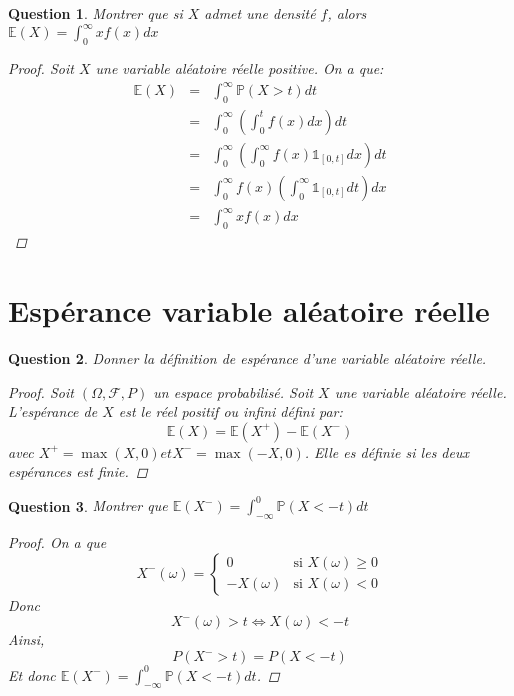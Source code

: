 \documentclass{article}
\theoremstyle{plain}
\newtheorem{question}{Question}
\theoremstyle{definition}
\begin{document}
\begin{question}
	Montrer que si $X$ admet une densité $f$, alors $\mathbb{E} (X) = \int_0^{\infty} x f(x) dx$
	\begin{proof}
		Soit $X$ une variable aléatoire réelle positive. On a que:
		\begin{eqnarray*}
			\mathbb{E} (X) &=& \int_0^{\infty} \mathbb{P} (X > t) dt \\
			&=& \int_0^{\infty} \left( \int_0^{t} f(x) dx \right) dt \\
			&=& \int_0^{\infty} \left( \int_0^{\infty} f(x) \mathds{1}_{[0, t]} dx \right) dt \\
			&=& \int_0^{\infty} f(x) \left( \int_0^{\infty} \mathds{1}_{[0, t]} dt \right) dx \\
			&=& \int_0^{\infty} x f(x) dx
		\end{eqnarray*}
	\end{proof}

\end{question}

\section{Espérance variable aléatoire réelle}

\begin{question}
	Donner la définition de espérance d'une variable aléatoire réelle.
	\begin{proof}
		Soit $(\Omega, \mathscr{F}, P)$ un espace probabilisé. Soit $X$ une variable aléatoire réelle. L'espérance de $X$ est le réel positif ou infini défini par:
		\begin{equation*}
			\mathbb{E} (X) = \mathbb{E} (X^+) - \mathbb{E} (X^-)
		\end{equation*}
		avec $X^+ = \max(X, 0) et X^- = \max(-X, 0)$. Elle es définie si les deux espérances est finie.
	\end{proof}
\end{question}

\begin{question}
	Montrer que $\mathbb{E} (X^-) = \int_{-\infty}^0 \mathbb{P} (X < -t) dt$

	\begin{proof}
		On a que
		\begin{equation*}
			X^-(\omega) = \left\{
			\begin{aligned}
				0          & \text{si $X(\omega) \geq 0$} \\
				-X(\omega) & \text{si $X(\omega) < 0$}
			\end{aligned}
			\right.
		\end{equation*}
		Donc
		\[X^-(\omega) > t \iff X(\omega) < -t\]
		Ainsi,
		\[P(X^- > t) = P(X < -t)\]
		Et donc $\mathbb{E} (X^-) = \int_{-\infty}^0 \mathbb{P} (X < -t) dt$.
	\end{proof}
\end{question}
\end{document}
